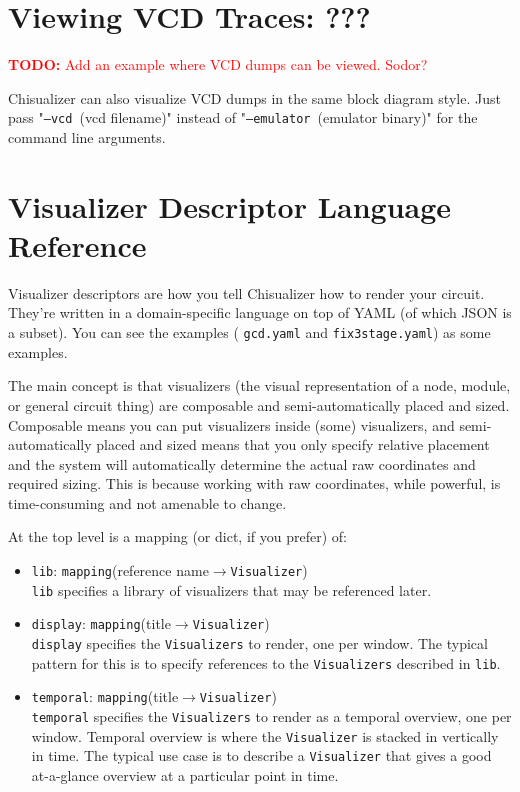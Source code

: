 \documentclass[11pt]{article}
\newcommand{\todo}[1]{\textcolor{red}{\textbf{TODO:} #1}}
\begin{document}
\section{Viewing VCD Traces: ???}
\todo{Add an example where VCD dumps can be viewed. Sodor?}

Chisualizer can also visualize VCD dumps in the same block diagram style. Just pass "\texttt{--vcd }(vcd filename)" instead of "\texttt{--emulator }(emulator binary)" for the command line arguments.

\section{Visualizer Descriptor Language Reference}
Visualizer descriptors are how you tell Chisualizer how to render your circuit. They're written in a domain-specific language on top of YAML (of which JSON is a subset). You can see the examples ( \texttt{gcd.yaml} and \texttt{fix3stage.yaml}) as some examples.

The main concept is that visualizers (the visual representation of a node, module, or general circuit thing) are composable and semi-automatically placed and sized. Composable means you can put visualizers inside (some) visualizers, and semi-automatically placed and sized means that you only specify relative placement and the system will automatically determine the actual raw coordinates and required sizing. This is because working with raw coordinates, while powerful, is time-consuming and not amenable to change.

At the top level is a mapping (or dict, if you prefer) of:
\begin{itemize}
  \item \texttt{lib}: \texttt{mapping}(reference name$\rightarrow$\texttt{Visualizer}) \\
  \texttt{lib} specifies a library of visualizers that may be referenced later.

  \item \texttt{display}: \texttt{mapping}(title$\rightarrow$\texttt{Visualizer}) \\
  \texttt{display} specifies the \texttt{Visualizers} to render, one per window. The typical pattern for this is to specify references to the \texttt{Visualizers} described in \texttt{lib}.
  
  \item \texttt{temporal}: \texttt{mapping}(title$\rightarrow$\texttt{Visualizer}) \\
  \texttt{temporal} specifies the \texttt{Visualizers} to render as a temporal overview, one per window. Temporal overview is where the \texttt{Visualizer} is stacked in vertically in time. The typical use case is to describe a \texttt{Visualizer} that gives a good at-a-glance overview at a particular point in time.
\end{itemize}
\end{document}
